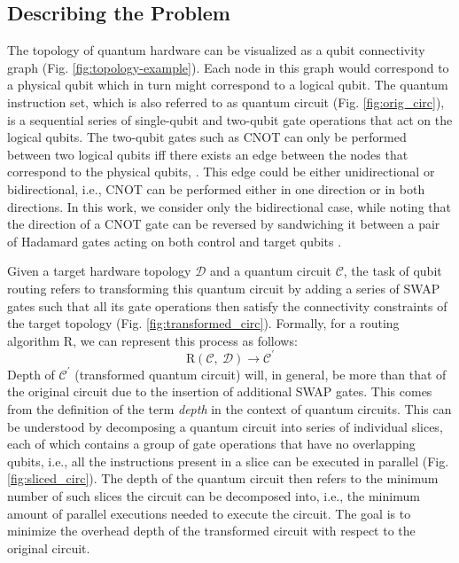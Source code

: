 \subsection{\label{sec:intro-defn}Describing the Problem}
The topology of quantum hardware can be visualized as a qubit connectivity graph (Fig. \ref{fig:topology-example}). Each node in this graph would correspond to a physical qubit which in turn might correspond to a logical qubit. The quantum instruction set, which is also referred to as quantum circuit (Fig. \ref{fig:orig_circ}), is a sequential series of single-qubit and two-qubit gate operations that act on the logical qubits. The two-qubit gates such as CNOT can only be performed between two logical qubits iff there exists an edge between the nodes that correspond to the physical qubits, \cite{qroute_dqn1}. This edge could be either unidirectional or bidirectional, i.e., CNOT can be performed either in one direction or in both directions. In this work, we consider only the bidirectional case, while noting that the direction of a CNOT gate can be reversed by sandwiching it between a pair of Hadamard gates acting on both control and target qubits \cite{utk_equiv_circuits}. 

Given a target hardware topology $\mathcal{D}$ and a quantum circuit $\mathcal{C}$, the task of qubit routing refers to transforming this quantum circuit by adding a series of SWAP gates such that all its gate operations then satisfy the connectivity constraints of the target topology (Fig. \ref{fig:transformed_circ}). Formally, for a routing algorithm $\textrm{R}$, we can represent this process as follows:
\begin{equation}
\textrm{R}(\mathcal{C},\ \mathcal{D}) \rightarrow \mathcal{C}^{\prime}
\end{equation}
Depth of $\mathcal{C}^{\prime}$ (transformed quantum circuit) will, in general, be more than that of the original circuit due to the insertion of additional SWAP gates. This comes from the definition of the term \textit{depth} in the context of quantum circuits. This can be understood by decomposing a quantum circuit into series of individual slices, each of which contains a group of gate operations that have no overlapping qubits, i.e., all the instructions present in a slice can be executed in parallel (Fig. \ref{fig:sliced_circ}). The depth of the quantum circuit then refers to the minimum number of such slices the circuit can be decomposed into, i.e., the minimum amount of parallel executions needed to execute the circuit. The goal is to minimize the overhead depth of the transformed circuit with respect to the original circuit.


